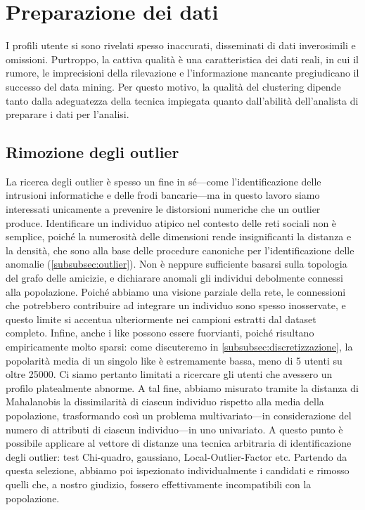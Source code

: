 \section{Preparazione dei dati}
\label{preparazione_dati}
I profili utente si sono rivelati spesso inaccurati, disseminati di dati inverosimili e omissioni. Purtroppo, la cattiva qualit\`a \`e una caratteristica dei dati reali, in cui il rumore, le imprecisioni della rilevazione e l'informazione mancante pregiudicano il successo del data mining. Per questo motivo, la qualit\`a del clustering dipende tanto dalla adeguatezza della tecnica impiegata quanto dall'abilit\`a dell'analista di preparare i dati per l'analisi.
\subsection{Rimozione degli outlier}
La ricerca degli outlier \`e spesso un fine in s\'e---come l'identificazione delle intrusioni informatiche e delle frodi bancarie---ma in questo lavoro siamo interessati unicamente a prevenire le distorsioni numeriche che un outlier produce. Identificare un individuo atipico nel contesto delle reti sociali non \`e semplice, poich\'e la numerosit\`a delle dimensioni rende insignificanti la distanza e la densit\`a, che sono alla base delle procedure canoniche per l'identificazione delle anomalie (\autoref{subsubsec:outlier}). Non \`e neppure sufficiente basarsi sulla topologia del grafo delle amicizie, e dichiarare anomali gli individui debolmente connessi alla popolazione. Poich\'e abbiamo una visione parziale della rete, le connessioni che potrebbero contribuire ad integrare un individuo sono spesso inosservate, e questo limite si accentua ulteriormente nei campioni estratti dal dataset completo. Infine, anche i like possono essere fuorvianti, poich\'e risultano empiricamente molto sparsi: come discuteremo in \autoref{subsubsec:discretizzazione}, la popolarit\`a media di un singolo like \`e estremamente bassa, meno di 5 utenti su oltre 25000. Ci siamo pertanto limitati a ricercare gli utenti che avessero un profilo platealmente abnorme. A tal fine, abbiamo misurato tramite la distanza di Mahalanobis la dissimilarit\`a di ciascun individuo rispetto alla media della popolazione, trasformando cos\`i un problema multivariato---in considerazione del numero di attributi di ciascun individuo---in uno univariato. A questo punto \`e possibile applicare al vettore di distanze una tecnica arbitraria di identificazione degli outlier: test Chi-quadro, gaussiano, Local-Outlier-Factor etc. Partendo da questa selezione, abbiamo poi ispezionato individualmente i candidati e rimosso quelli che, a nostro giudizio, fossero effettivamente incompatibili con la popolazione.
